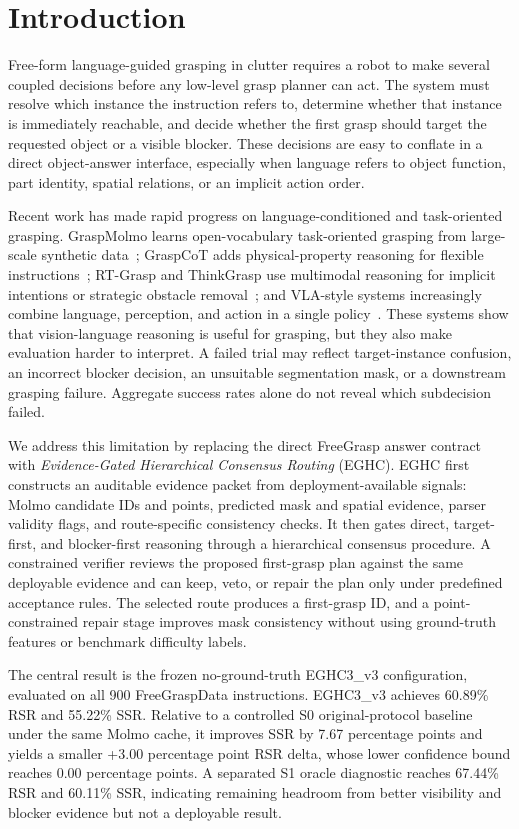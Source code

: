 \section{Introduction}

Free-form language-guided grasping in clutter requires a robot to make several coupled decisions before any low-level grasp planner can act. The system must resolve which instance the instruction refers to, determine whether that instance is immediately reachable, and decide whether the first grasp should target the requested object or a visible blocker. These decisions are easy to conflate in a direct object-answer interface, especially when language refers to object function, part identity, spatial relations, or an implicit action order.

Recent work has made rapid progress on language-conditioned and task-oriented grasping. GraspMolmo learns open-vocabulary task-oriented grasping from large-scale synthetic data~\cite{graspmolmo}; GraspCoT adds physical-property reasoning for flexible instructions~\cite{graspcot}; RT-Grasp and ThinkGrasp use multimodal reasoning for implicit intentions or strategic obstacle removal~\cite{rtgrasp,thinkgrasp}; and VLA-style systems increasingly combine language, perception, and action in a single policy~\cite{graspvla,dexgraspvla}. These systems show that vision-language reasoning is useful for grasping, but they also make evaluation harder to interpret. A failed trial may reflect target-instance confusion, an incorrect blocker decision, an unsuitable segmentation mask, or a downstream grasping failure. Aggregate success rates alone do not reveal which subdecision failed.

We address this limitation by replacing the direct FreeGrasp answer contract with \emph{Evidence-Gated Hierarchical Consensus Routing} (EGHC). EGHC first constructs an auditable evidence packet from deployment-available signals: Molmo candidate IDs and points, predicted mask and spatial evidence, parser validity flags, and route-specific consistency checks. It then gates direct, target-first, and blocker-first reasoning through a hierarchical consensus procedure. A constrained verifier reviews the proposed first-grasp plan against the same deployable evidence and can keep, veto, or repair the plan only under predefined acceptance rules. The selected route produces a first-grasp ID, and a point-constrained repair stage improves mask consistency without using ground-truth features or benchmark difficulty labels.

The central result is the frozen no-ground-truth EGHC3\_v3 configuration, evaluated on all 900 FreeGraspData instructions. EGHC3\_v3 achieves 60.89\% RSR and 55.22\% SSR. Relative to a controlled S0 original-protocol baseline under the same Molmo cache, it improves SSR by 7.67 percentage points and yields a smaller +3.00 percentage point RSR delta, whose lower confidence bound reaches 0.00 percentage points. A separated S1 oracle diagnostic reaches 67.44\% RSR and 60.11\% SSR, indicating remaining headroom from better visibility and blocker evidence but not a deployable result.

